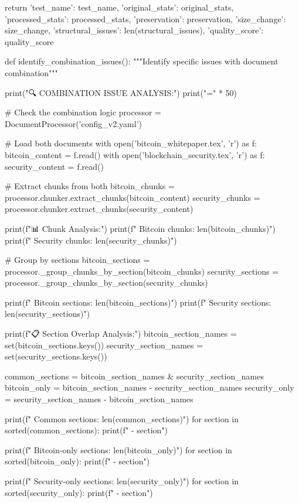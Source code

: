     return {
        'test_name': test_name,
        'original_stats': original_stats,
        'processed_stats': processed_stats,
        'preservation': preservation,
        'size_change': size_change,
        'structural_issues': len(structural_issues),
        'quality_score': quality_score
    }

def identify_combination_issues():
    """Identify specific issues with document combination"""
    
    print("\n🔍 COMBINATION ISSUE ANALYSIS:")
    print("=" * 50)
    
    # Check the combination logic
    processor = DocumentProcessor('config_v2.yaml')
    
    # Load both documents
    with open('bitcoin_whitepaper.tex', 'r') as f:
        bitcoin_content = f.read()
    with open('blockchain_security.tex', 'r') as f:
        security_content = f.read()
    
    # Extract chunks from both
    bitcoin_chunks = processor.chunker.extract_chunks(bitcoin_content)
    security_chunks = processor.chunker.extract_chunks(security_content)
    
    print(f"📊 Chunk Analysis:")
    print(f"  Bitcoin chunks: {len(bitcoin_chunks)}")
    print(f"  Security chunks: {len(security_chunks)}")
    
    # Group by sections
    bitcoin_sections = processor._group_chunks_by_section(bitcoin_chunks)
    security_sections = processor._group_chunks_by_section(security_chunks)
    
    print(f"  Bitcoin sections: {len(bitcoin_sections)}")
    print(f"  Security sections: {len(security_sections)}")
    
    print(f"\n📋 Section Overlap Analysis:")
    bitcoin_section_names = set(bitcoin_sections.keys())
    security_section_names = set(security_sections.keys())
    
    common_sections = bitcoin_section_names & security_section_names
    bitcoin_only = bitcoin_section_names - security_section_names
    security_only = security_section_names - bitcoin_section_names
    
    print(f"  Common sections: {len(common_sections)}")
    for section in sorted(common_sections):
        print(f"    - {section}")
    
    print(f"  Bitcoin-only sections: {len(bitcoin_only)}")
    for section in sorted(bitcoin_only):
        print(f"    - {section}")
    
    print(f"  Security-only sections: {len(security_only)}")
    for section in sorted(security_only):
        print(f"    - {section}")
    
